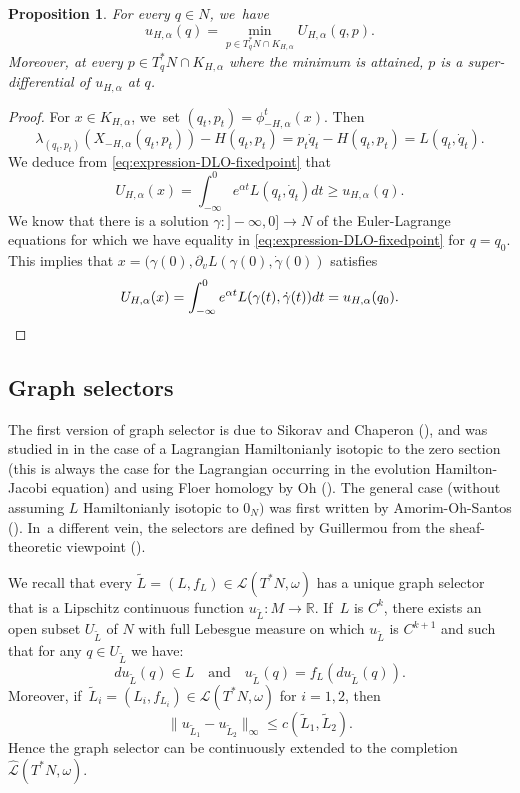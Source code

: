 \documentclass[10pt]{amsart}
\newtheorem{prop}[thm]{Proposition}
\theoremstyle{definition}
\newcommand {\LL}{{\mathcal L}}
\newcommand{\R}{\mathbb{R}}
\newcommand{\hatLL}{\widehat{\LL}}
\begin{document}
\begin{prop}\label{prop:u-and-U}
For every $q\in N$, we~have
\[
u_{H, \alpha}(q)=\min_{p\in T_q^*N\cap K_{H, \alpha}}U_{H, \alpha}(q,p).
\]
Moreover, at every $p\in T_q^*N\cap K_{H, \alpha}$ where the minimum is attained, $p$ is a super-differential of $u_{H, \alpha}$ at $q$.
\end{prop}
\begin{proof} For $x\in K_{H, \alpha}$, we~set $(q_t, p_t)=\phi_{-H, \alpha}^t(x)$. Then
\[
\lambda_{(q_t, p_t)}(X_{-H, \alpha}(q_t, p_t))-H(q_t, p_t)=p_t\dot q_t-H(q_t, p_t)=L(q_t, \dot q_t).
\]
We deduce from \eqref{eq:expression-DLO-fixedpoint} that
\[
U_{H, \alpha}(x)=\int_{-\infty}^0 e^{\alpha t}L(q_t, \dot q_t)dt\geq u_{H, \alpha}(q).
\]
We know that there is a solution $\gamma:{}]-\infty, 0]\to N$ of the Euler-Lagrange equations for which we have equality in \eqref{eq:expression-DLO-fixedpoint} for $q=q_0$. This implies that $x=(\gamma(0), \partial_vL(\gamma(0), \dot \gamma(0))$ satisfies
\[
U_{H, \alpha}(x)=\int_{-\infty}^0e^{\alpha t}L(\gamma(t), \dot\gamma (t))dt=u_{H, \alpha}(q_0).\qedhere
\]
\end{proof}

\subsection{Graph selectors}\label{sec:graph-selectors}The first version of graph selector is due to Sikorav and Chaperon (\cite{Sik,Chaperon-HJ}), and was studied in
\cite{Viterbo-Ottolenghi,Viterbo-Ott} in the case of a Lagrangian Hamiltonianly isotopic to the zero section (this is always the case for the Lagrangian occurring in the evolution Hamilton-Jacobi equation) and using Floer homology by Oh (\cite{Oh-action-functional-I}). The general case (without assuming $L$ Hamiltonianly isotopic to $0_N)$ was first written by Amorim-Oh-Santos (\cite{Amorim-Oh-Santos}). In~a different vein, the selectors are defined by Guillermou from the sheaf-theoretic viewpoint (\cite{Vichery-these,Guillermou-Asterisque}).

We recall that every $\tilde L=(L, f_L)\in\LL(T^*N,\omega)$ has a unique graph selector that is a Lipschitz continuous function $u_{\tilde L}:M\to \R$. If~$L$ is $C^k$, there exists an open subset $U_{\tilde L}$ of $N$ with full Lebesgue measure on which $u_{\tilde L}$ is $C^{k+1}$ and such that for any $q\in U_{\tilde L}$ we have:
\[
du_{\tilde L}(q)\in L\quad\text{and}\quad u_{\tilde L}(q)=f_L(du_{\tilde L}(q)).
\]
Moreover, if~$\tilde L_i=(L_i, f_{L_i})\in\LL(T^*N,\omega)$ for $i=1, 2$, then
\[
\| u_{\tilde L_1}-u_{\tilde L_2}\|_\infty\leq c(\tilde L_1, \tilde L_2).
\]
Hence the graph selector can be continuously extended to the completion $\hatLL(T^*N,\omega)$.
\end{document}

